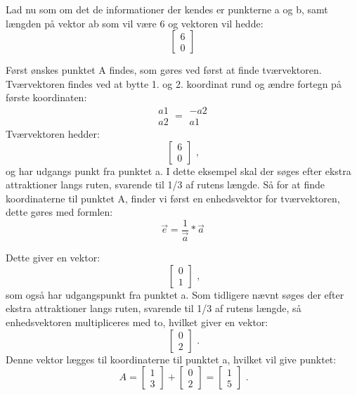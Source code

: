 Lad nu som om det de informationer der kendes er punkterne a og b, samt længden på vektor ab som vil være 6 og vektoren vil hedde:
\[ \begin{bmatrix} 6 \\ 0 \end{bmatrix} \]

Først ønskes punktet A findes, som gøres ved først at finde tværvektoren. Tværvektoren findes ved at bytte 1. og 2. koordinat rund og ændre fortegn på første koordinaten:
\[ \begin{matrix} a1 \\ a2 \end{matrix} = \begin{matrix} -a2 \\ a1 \end{matrix} \]
Tværvektoren hedder: 
\[ \begin{bmatrix} 6 \\ 0 \end{bmatrix} \text{ ,} \]
og har udgangs punkt fra punktet a. \newline
I dette eksempel skal der søges efter ekstra attraktioner langs ruten, svarende til 1/3 af rutens længde. Så for at finde koordinaterne til punktet A, finder vi først en enhedsvektor for tværvektoren, dette gøres med formlen:
\[ \overrightarrow{e} = \frac{1}{\overrightarrow{a}}*\overrightarrow{a} \] 

Dette giver en vektor: 
\[\ \begin{bmatrix} 0 \\ 1 \end{bmatrix} \text{ ,} \]
som også har udgangspunkt fra punktet a. Som tidligere nævnt søges der efter ekstra attraktioner langs ruten, svarende til 1/3 af rutens længde, så enhedsvektoren multipliceres med to, hvilket giver en vektor: 
\[\ \begin{bmatrix} 0 \\ 2 \end{bmatrix} \textbf{ .} \]
Denne vektor lægges til koordinaterne til punktet a, hvilket vil give punktet:
\[\ A = \begin{bmatrix} 1 \\ 3 \end{bmatrix} + \begin{bmatrix} 0 \\ 2 \end{bmatrix} = \begin{bmatrix} 1 \\ 5 \end{bmatrix} \text{ .} \]

